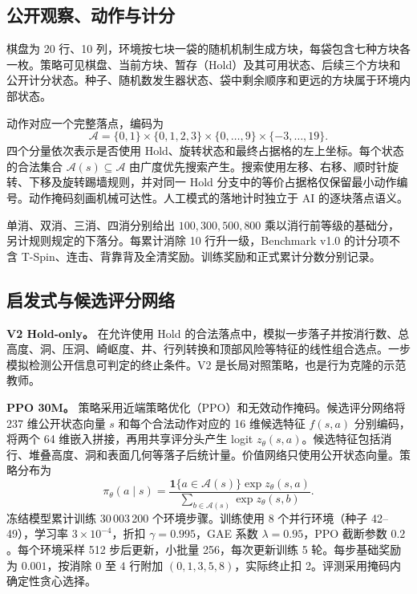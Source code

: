 \documentclass[UTF8,fontset=none,zihao=-4,a4paper]{ctexart}
\newcommand{\1}{\mathbf{1}}
\begin{document}
\subsection{公开观察、动作与计分}

棋盘为 20 行、10 列，环境按七块一袋的随机机制生成方块，每袋包含七种方块各一枚。策略可见棋盘、当前方块、暂存（Hold）及其可用状态、后续三个方块和公开计分状态。种子、随机数发生器状态、袋中剩余顺序和更远的方块属于环境内部状态。

动作对应一个完整落点，编码为
\[
  \mathcal{A} = \{0,1\}\times\{0,1,2,3\}\times\{0,\ldots,9\}
  \times\{-3,\ldots,19\}.
\]
四个分量依次表示是否使用 Hold、旋转状态和最终占据格的左上坐标。每个状态的合法集合 $\mathcal{A}(s)\subseteq\mathcal{A}$ 由广度优先搜索产生。搜索使用左移、右移、顺时针旋转、下移及旋转踢墙规则，并对同一 Hold 分支中的等价占据格仅保留最小动作编号。动作掩码刻画机械可达性。人工模式的落地计时独立于 AI 的逐块落点语义\cite{rules}。

单消、双消、三消、四消分别给出 $100, 300, 500, 800$ 乘以消行前等级的基础分，另计规则规定的下落分。每累计消除 10 行升一级，Benchmark v1.0 的计分项不含 T-Spin、连击、背靠背及全清奖励。训练奖励和正式累计分数分别记录。

\subsection{启发式与候选评分网络}

\textbf{V2 Hold-only。} 在允许使用 Hold 的合法落点中，模拟一步落子并按消行数、总高度、洞、压洞、崎岖度、井、行列转换和顶部风险等特征的线性组合选点。一步模拟检测公开信息可判定的终止条件。V2 是长局对照策略，也是行为克隆的示范教师。

\textbf{PPO 30M。} 策略采用近端策略优化（PPO）\cite{schulman2017}和无效动作掩码\cite{huang2022}。候选评分网络将 237 维公开状态向量 $s$ 和每个合法动作对应的 16 维候选特征 $f(s,a)$ 分别编码，将两个 64 维嵌入拼接，再用共享评分头产生 logit $z_\theta(s,a)$。候选特征包括消行、堆叠高度、洞和表面几何等落子后统计量。价值网络只使用公开状态向量。策略分布为
\begin{equation}
   \pi_\theta(a\mid s)=
   \frac{\1\{a\in\mathcal{A}(s)\}\exp z_\theta(s,a)}
        {\sum_{b\in\mathcal{A}(s)}\exp z_\theta(s,b)} .
   \label{eq:masked}
\end{equation}
冻结模型累计训练 30\,003\,200 个环境步骤。训练使用 8 个并行环境（种子 42--49），学习率 $3\times10^{-4}$，折扣 $\gamma=0.995$，GAE 系数 $\lambda=0.95$，PPO 截断参数 $0.2$。每个环境采样 512 步后更新，小批量 256，每次更新训练 5 轮。每步基础奖励为 $0.001$，按消除 $0$ 至 $4$ 行附加 $(0,1,3,5,8)$，实际终止扣 2。评测采用掩码内确定性贪心选择。
\end{document}
